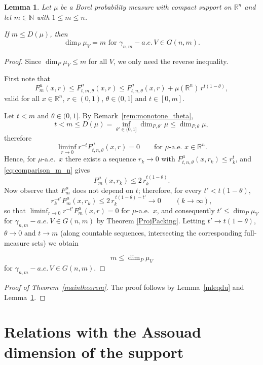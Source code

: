 \documentclass[12pt]{amsart}
\newtheorem{lemma}[theorem]{Lemma}
\theoremstyle{definition}
\theoremstyle{remark}
\numberwithin{equation}{section}
\begin{document}
\begin{lemma}\label{dumleq}
    Let $\mu$ be a Borel probability measure with compact support on
    $\mathbb{R}^n$ and let $m\in\mathbb{N}$ with $1\leq m\leq n$.
    
    If
    $m\leq D(\mu)$, then $$\dim_P \mu_V = m \text{ for }\gamma_{n,m}-a.e.\, V\in G(n,m).$$
\end{lemma}
\begin{proof}
Since $\dim_P\mu_V\leq m$ for all $V$, we only need the reverse
inequality.

First note that
\begin{equation}\label{eq:comparison_m_n}
    F_m^{\mu}(x,r)\leq F_{t,m,\theta}^\mu(x,r)
    \leq F_{t,n,\theta}^\mu(x,r) + \mu(\mathbb{R}^n)\, r^{t(1-\theta)},
\end{equation}
valid for all $x\in\mathbb{R}^n$, $r\in(0,1)$, $\theta\in(0,1]$ and
$t\in[0,m]$. 

Let $t<m$ and $\theta\in(0,1]$. By Remark~\ref{rem:monotone_theta},
$$t<m\leq D(\mu)=\inf_{\theta'\in(0,1]}\dim_{P,\theta'}\mu
\leq \dim_{P,\theta}\mu,$$
therefore
$$\liminf_{r\to 0}r^{-t}F_{t,n,\theta}^{\mu}(x,r)=0
\qquad\text{for }\mu\text{-a.e.\ }x\in\mathbb{R}^{n}.$$
Hence, for $\mu$-a.e.\ $x$ there exists a sequence $r_k\to 0$ with
$F_{t,n,\theta}^\mu(x,r_k)\leq r_k^{t}$, and \eqref{eq:comparison_m_n}
gives
$$F_m^{\mu}(x,r_k)\leq 2\,r_k^{t(1-\theta)}.$$
Now observe that $F_m^\mu$ does not depend on $t$; therefore, for every
$t'<t(1-\theta)$,
$$r_k^{-t'}F_m^{\mu}(x,r_k)\leq 2\,r_k^{\,t(1-\theta)-t'}
\longrightarrow 0\qquad (k\to\infty),$$
so that $\liminf_{r\to 0}r^{-t'}F_m^\mu(x,r)=0$ for $\mu$-a.e.\ $x$, and
consequently $t'\leq\dim_P\mu_V$ for $\gamma_{n,m}-a.e.\ V\in G(n,m)$ by Theorem \ref{ProjPacking}. Letting $t'\to t(1-\theta)$, $\theta\to 0$ and $t\to m$ (along countable sequences,
intersecting the corresponding full-measure sets) we obtain

$$m\leq\dim_P\mu_V$$
for $\gamma_{n,m}-a.e.\, V\in G(n,m)$.
\end{proof}

\begin{proof}[Proof of Theorem~\ref{maintheorem}]
The proof follows by Lemma~\ref{mleqdu} and Lemma~\ref{dumleq}.
\end{proof}


\section{Relations with the Assouad dimension of the support}
\end{document}
